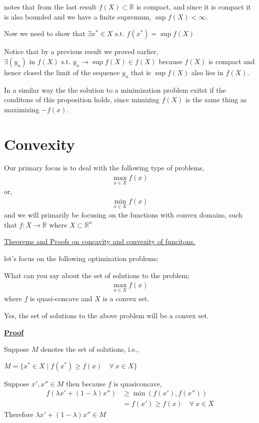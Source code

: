\documentclass[12pt,a4paper]{article}
\begin{document}
notes that from the last result \(f(X) \subset \mathbb{R}\) is compact, and since it is compact it is also bounded and we have a finite supremum, \(\sup f(X) < \infty\).

Now we need to show that \(\exists x^* \in X \text{ s.t. } f(x^*)=\sup f(X)\)  

Notice that by a previous result we proved earlier, \(\exists (y_{n}) \text{ in } f(X) \text{ s.t. } y_{n} \to \sup f(X) \in f(X)\) because \(f(X)\) is compact and hence closed the limit of the sequence \(y_{n}\) that is \(\sup f(X)\) also lies in \(f(X)\). 

In a similar way the the solution to a minimization problem exitst if the conditons of this proposition holds, since mimizing \(f(X)\)  is the same thing as maximizing \(-f(x)\).  

\section{Convexity}
Our primary focus is to deal with the following type of problems, 
 \begin{align*}
    \max_{x \in X} f(x)
\end{align*}
or,
\begin{align*}
    \min_{x \in X} f(x)
\end{align*}
and we will primarily be focusing on the functions with convex domains, such that \(f: X \to \mathbb{R}\) where \(X \subset \mathbb{R}^n\)

\href{https://github.com/econhead/NOTES/blob/master/Mathematics/Convexity/Convexity.pdf}{Theorems and Proofs on concavity and convexity of funcitons.}

let's focus on the following optimization problems;

What can you say about the set of solutions to the problem;
 \begin{align*}
    \max_{x \in X} f(x) 
\end{align*}
where \(f\) is quasi-concave and \(X\) is a convex set.

Yes, the set of solutions to the above problem will be a convex set.

\underline{\textbf{Proof}}

Suppose \(M\) denotes the set of solutions, i.e., 

\(M= \{x^* \in X \mid f(x^*)\geq f(x) \quad \forall \ x \in X\}\)   

Suppose \(x',x'' \in M\)  then because \(f\) is quasiconcave,
 \begin{align*}
    f(\lambda x' + (1-\lambda)x'') &\geq \min(f(x'),f(x''))\\
    & =f(x') \geq f(x) \quad \forall \ x \in X
\end{align*}
Therefore \(\lambda x' + (1-\lambda)x'' \in M\)  
\end{document}
